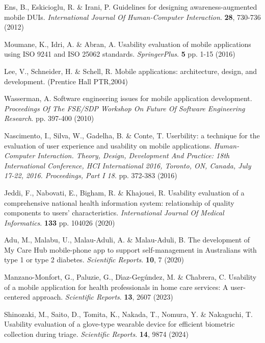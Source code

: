 \documentclass[preprint,12pt]{elsarticle}
\begin{document}
\begin{thebibliography}{99}
Ens, B., Eskicioglu, R. \& Irani, P. Guidelines for designing awareness-augmented mobile DUIs. {\em International Journal Of Human-Computer Interaction}. \textbf{28}, 730-736 (2012)

Moumane, K., Idri, A. \& Abran, A. Usability evaluation of mobile applications using ISO 9241 and ISO 25062 standards. {\em SpringerPlus}. \textbf{5} pp. 1-15 (2016)

Lee, V., Schneider, H. \& Schell, R. Mobile applications: architecture, design, and development. (Prentice Hall PTR,2004)

Wasserman, A. Software engineering issues for mobile application development. {\em Proceedings Of The FSE/SDP Workshop On Future Of Software Engineering Research}. pp. 397-400 (2010)

Nascimento, I., Silva, W., Gadelha, B. \& Conte, T. Userbility: a technique for the evaluation of user experience and usability on mobile applications. {\em Human-Computer Interaction. Theory, Design, Development And Practice: 18th International Conference, HCI International 2016, Toronto, ON, Canada, July 17-22, 2016. Proceedings, Part I 18}. pp. 372-383 (2016)

Jeddi, F., Nabovati, E., Bigham, R. \& Khajouei, R. Usability evaluation of a comprehensive national health information system: relationship of quality components to users’ characteristics. {\em International Journal Of Medical Informatics}. \textbf{133} pp. 104026 (2020)

Adu, M., Malabu, U., Malau-Aduli, A. \& Malau-Aduli, B. The development of My Care Hub mobile-phone app to support self-management in Australians with type 1 or type 2 diabetes. {\em Scientific Reports}. \textbf{10}, 7 (2020)

Manzano-Monfort, G., Paluzie, G., D\'{\i}az-Gegúndez, M. \& Chabrera, C. Usability of a mobile application for health professionals in home care services: A user-centered approach. {\em Scientific Reports}. \textbf{13}, 2607 (2023)

Shinozaki, M., Saito, D., Tomita, K., Nakada, T., Nomura, Y. \& Nakaguchi, T. Usability evaluation of a glove-type wearable device for efficient biometric collection during triage. {\em Scientific Reports}. \textbf{14}, 9874 (2024)


\end{thebibliography}
\end{document}
